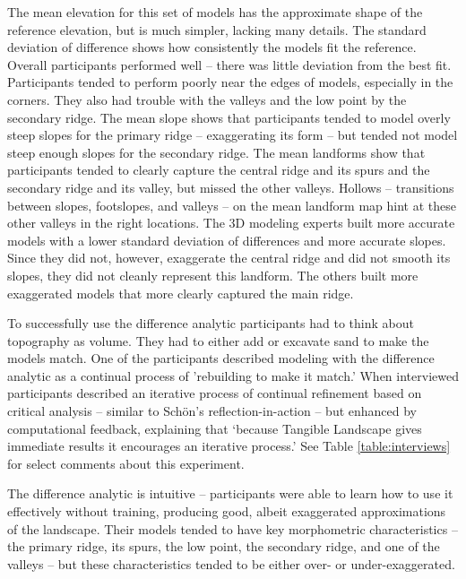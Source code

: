\documentclass[Afour,sageh,times]{sagej}
\begin{document}
The mean elevation for this set of models
has the approximate shape of the reference elevation, 
but is much simpler, lacking many details. 
The standard deviation of difference shows 
how consistently the models fit the reference. 
Overall participants performed well -- 
there was little deviation from the best fit. 
Participants tended to perform poorly 
near the edges of models, especially in the corners.
They also had trouble with the valleys 
and the low point by the secondary ridge.
The mean slope shows that participants tended to model 
overly steep slopes for the primary ridge -- exaggerating its form --
but tended not model steep enough slopes for the secondary ridge. 
The mean landforms show that participants tended to 
clearly capture the central ridge and its spurs and
the secondary ridge and its valley, but missed the 
other valleys.
Hollows -- transitions between slopes, footslopes, and valleys -- 
on the mean landform map hint at these other 
valleys in the right locations.
The 3D modeling experts built more accurate models
with a lower standard deviation of differences 
and more accurate slopes. 
Since they did not, however, exaggerate the central ridge
and did not smooth its slopes, 
they did not cleanly represent this landform. 
The others built more exaggerated models 
that more clearly captured the main ridge.

To successfully use the difference analytic 
participants had to think about topography as volume.
They had to either add or excavate sand to make the models match. 
One of the participants 
described modeling with the difference analytic
as a continual process of 'rebuilding to make it match.'
When interviewed
participants described an iterative process of 
continual refinement based on critical analysis 
-- similar to Sch{\"o}n's reflection-in-action \cite{Schon1983} --
but enhanced by computational feedback,
explaining that 
`because Tangible Landscape gives immediate results 
it encourages an iterative process.' 
See Table \ref{table:interviews} for select comments about this experiment.

The difference analytic is intuitive -- 
participants were able to learn how to use it effectively without training, 
producing good, albeit exaggerated approximations of the landscape. 
%
Their models tended to have key morphometric characteristics -- 
the primary ridge, its spurs, the low point, 
the secondary ridge, and one of the valleys -- 
but these characteristics tended to be 
either over- or under-exaggerated.
\end{document}
